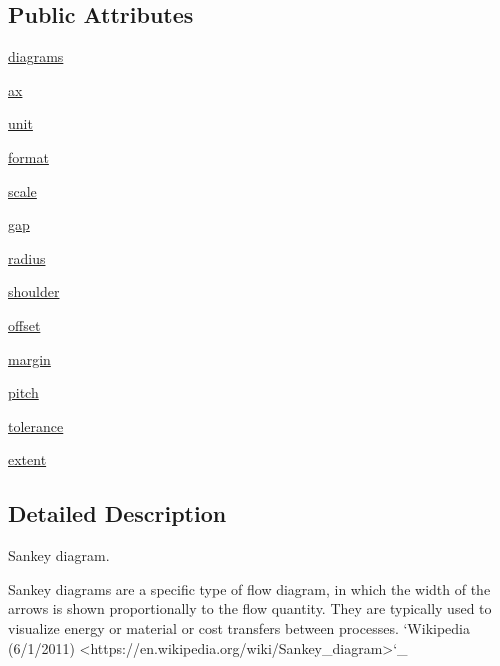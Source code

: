 \subsection*{Public Attributes}
\begin{DoxyCompactItemize}
\item 
\hyperlink{classmatplotlib_1_1sankey_1_1Sankey_a608277c3689602e9b049d12d85ecb79b}{diagrams}
\item 
\hyperlink{classmatplotlib_1_1sankey_1_1Sankey_af65ce4aa30db6f202bab576b9e00371d}{ax}
\item 
\hyperlink{classmatplotlib_1_1sankey_1_1Sankey_aee04e3cc09339db7c145307e47f41f0c}{unit}
\item 
\hyperlink{classmatplotlib_1_1sankey_1_1Sankey_ab979bfec5e6e2aba5cc5838895d359bb}{format}
\item 
\hyperlink{classmatplotlib_1_1sankey_1_1Sankey_ad64f7253858e72fe031d0695219f343e}{scale}
\item 
\hyperlink{classmatplotlib_1_1sankey_1_1Sankey_aa1c1ab0bc8eb146c8a10e3ad8772d515}{gap}
\item 
\hyperlink{classmatplotlib_1_1sankey_1_1Sankey_a934e06a3529a1e439fa475f99a1f313e}{radius}
\item 
\hyperlink{classmatplotlib_1_1sankey_1_1Sankey_a9c51cb448b29baf758080fe073a38558}{shoulder}
\item 
\hyperlink{classmatplotlib_1_1sankey_1_1Sankey_ac292e7aafeff7a2fc449bcd1ea93d3b7}{offset}
\item 
\hyperlink{classmatplotlib_1_1sankey_1_1Sankey_a4ebac29b6132b67aa72c312971feec58}{margin}
\item 
\hyperlink{classmatplotlib_1_1sankey_1_1Sankey_a9178b93aeeabdfab7d2ff85cabd08fc8}{pitch}
\item 
\hyperlink{classmatplotlib_1_1sankey_1_1Sankey_ad1f395cfb14ba7b70e7f5c5daab9f333}{tolerance}
\item 
\hyperlink{classmatplotlib_1_1sankey_1_1Sankey_acf0a4d5ab19975292db62bea2593bcc6}{extent}
\end{DoxyCompactItemize}


\subsection{Detailed Description}
\begin{DoxyVerb}Sankey diagram.

  Sankey diagrams are a specific type of flow diagram, in which
  the width of the arrows is shown proportionally to the flow
  quantity.  They are typically used to visualize energy or
  material or cost transfers between processes.
  `Wikipedia (6/1/2011) <https://en.wikipedia.org/wiki/Sankey_diagram>`_\end{DoxyVerb}
 

